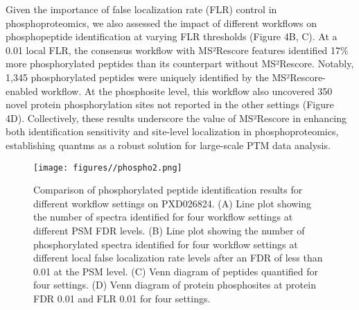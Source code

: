 \documentclass[12pt]{article}
\begin{document}
Given the importance of false localization rate (FLR) control in phosphoproteomics, we also assessed the impact of different workflows on phosphopeptide identification at varying FLR thresholds (Figure 4B, C). At a 0.01 local FLR, the consensus workflow with MS²Rescore features identified 17\% more phosphorylated peptides than its counterpart without MS²Rescore. Notably, 1,345 phosphorylated peptides were uniquely identified by the MS²Rescore-enabled workflow. At the phosphosite level, this workflow also uncovered 350 novel protein phosphorylation sites not reported in the other settings (Figure 4D). Collectively, these results underscore the value of MS²Rescore in enhancing both identification sensitivity and site-level localization in phosphoproteomics, establishing quantms as a robust solution for large-scale PTM data analysis. %

\begin{figure}[ht!]
	\centering
	\texttt{[image: figures//phospho2.png]}
	\caption{Comparison of phosphorylated peptide identification results for different workflow settings on PXD026824. (A) Line plot showing the number of spectra identified for four workflow settings at different PSM FDR levels. (B) Line plot showing the number of phosphorylated spectra identified for four workflow settings at different local false localization rate levels after an FDR of less than 0.01 at the PSM level. (C) Venn diagram of peptides quantified for four settings. (D) Venn diagram of protein phosphosites at protein FDR 0.01 and FLR 0.01 for four settings.} %
	\label{fig:PXD026824_ms2rescore}
\end{figure}
\end{document}
